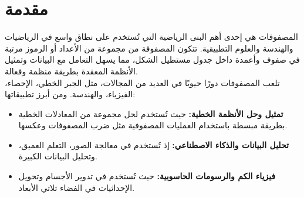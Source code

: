 \chapter*{مقدمة}
\noindent
المصفوفات هي إحدى أهم البنى الرياضية التي تُستخدم على نطاق واسع في الرياضيات والهندسة والعلوم التطبيقية. تتكون المصفوفة من مجموعة من الأعداد أو الرموز مرتبة في صفوف وأعمدة داخل جدول مستطيل الشكل، مما يسهل التعامل مع البيانات وتمثيل الأنظمة المعقدة بطريقة منظمة وفعالة.\\
\noindent
تلعب المصفوفات دورًا حيويًا في العديد من المجالات، مثل الجبر الخطي، الإحصاء، الفيزياء، والهندسة. ومن أبرز تطبيقاتها:
\begin{itemize}[leftmargin=*]
	\item \textbf{تمثيل وحل الأنظمة الخطية:} حيث تُستخدم لحل مجموعة من المعادلات الخطية بطريقة مبسطة باستخدام العمليات المصفوفية مثل ضرب المصفوفات وعكسها.
	\item \textbf{تحليل البيانات والذكاء الاصطناعي:} إذ تُستخدم في معالجة الصور، التعلم العميق، وتحليل البيانات الكبيرة.
	\item \textbf{فيزياء الكم والرسومات الحاسوبية:} حيث تُستخدم في تدوير الأجسام وتحويل الإحداثيات في الفضاء ثلاثي الأبعاد.
\end{itemize}